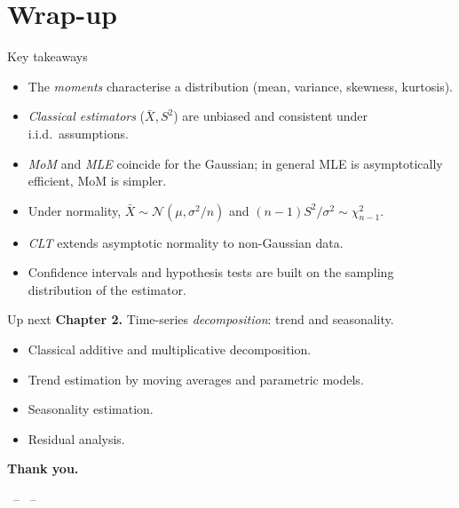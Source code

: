 \documentclass[aspectratio=169]{beamer}
\begin{document}
\section{Wrap-up}

\begin{frame}{Key takeaways}
  \begin{itemize}
    \item The \emph{moments} characterise a distribution
          (mean, variance, skewness, kurtosis).
    \item \emph{Classical estimators} ($\bar{X}, S^2$) are unbiased
          and consistent under i.i.d.\ assumptions.
    \item \emph{MoM} and \emph{MLE} coincide for the Gaussian; in
          general MLE is asymptotically efficient, MoM is simpler.
    \item Under normality, $\bar{X} \sim \mathcal{N}(\mu, \sigma^2/n)$
          and $(n-1)S^2 / \sigma^2 \sim \chi^2_{n-1}$.
    \item \emph{CLT} extends asymptotic normality to non-Gaussian data.
    \item Confidence intervals and hypothesis tests are
          built on the sampling distribution of the estimator.
  \end{itemize}
\end{frame}

\begin{frame}{Up next}
  \textbf{Chapter 2.} Time-series \emph{decomposition}: trend and
  seasonality.
  \medskip
  \begin{itemize}
    \item Classical additive and multiplicative decomposition.
    \item Trend estimation by moving averages and parametric models.
    \item Seasonality estimation.
    \item Residual analysis.
  \end{itemize}
  \medskip
  \begin{center}\Large\bfseries Thank you.\end{center}
  \begin{center}\footnotesize\auteurNom\ -- \auteurEmail\ -- \auteurInstitution\end{center}
\end{frame}
\end{document}
